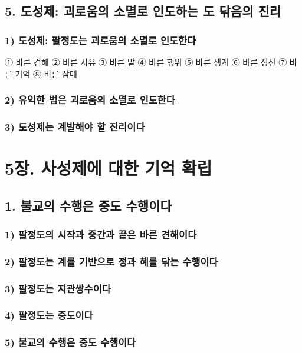 \documentclass[12pt, a4paper, oneside]{book}
\begin{document}
	\chapter{5. 도성제: 괴로움의 소멸로 인도하는 도 닦음의 진리}
	\section{1) 도성제: 팔정도는 괴로움의 소멸로 인도한다}
① 바른 견해
② 바른 사유
③ 바른 말
④ 바른 행위
⑤ 바른 생계
⑥ 바른 정진
⑦ 바른 기억
⑧ 바른 삼매
	\section{2) 유익한 법은 괴로움의 소멸로 인도한다}
	\section{3) 도성제는 계발해야 할 진리이다}



	\part{5장. 사성제에 대한 기억 확립}

	\newpage
	\chapter{1. 불교의 수행은 중도 수행이다}
	\section{1) 팔정도의 시작과 중간과 끝은 바른 견해이다}
	\section{2) 팔정도는 계를 기반으로 정과 혜를 닦는 수행이다}
	\section{3) 팔정도는 지관쌍수이다}
	\section{4) 팔정도는 중도이다}
	\section{5) 불교의 수행은 중도 수행이다}
\end{document}
